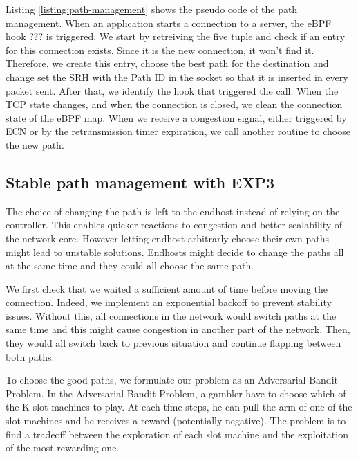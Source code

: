


Listing \ref{listing:path-management} shows the pseudo code of the path management.
When an application starts a connection to a server, the eBPF hook ??? is triggered.
We start by retreiving the five tuple and check if an entry for this connection exists.
Since it is the new connection, it won't find it. Therefore, we create this entry,
choose the best path for the destination and change set the SRH with the Path ID
in the socket so that it is inserted in every packet sent.
After that, we identify the hook that triggered the call. When the TCP state changes, and
when the connection is closed, we clean the connection state of the eBPF map. When we receive
a congestion signal, either triggered by ECN or by the retransmission timer expiration,
we call another routine to choose the new path.

\subsection{Stable path management with EXP3}

The choice of changing the path is left to the endhost instead of relying on the controller.
This enables quicker reactions to congestion and better scalability of the network core.
However letting endhost arbitrarly choose their own paths might lead to unstable solutions.
Endhosts might decide to change the paths all at the same time and they could all choose the same path.

We first check that we waited a sufficient amount of time before moving the connection.
Indeed, we implement an exponential backoff to prevent stability issues. Without this, all connections in the network
would switch paths at the same time and this might cause congestion in another part of the network.
Then, they would all switch back to previous situation and continue flapping between both paths.

To choose the good paths, we formulate our problem as an Adversarial Bandit Problem.
In the Adversarial Bandit Problem, a gambler have to choose which of the K slot machines
to play. At each time steps, he can pull the arm of one of the slot machines and he receives a reward
(potentially negative).
The problem is to find a tradeoff between the exploration of each slot machine and the exploitation
of the most rewarding one.

